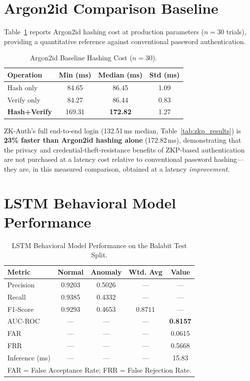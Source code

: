 \documentclass[12pt,a4paper,oneside]{report}
\begin{document}
\section{Argon2id Comparison Baseline}

Table~\ref{tab:argon_baseline} reports Argon2id hashing cost at
production parameters ($n=30$ trials), providing a quantitative
reference against conventional password authentication.

\begin{table}[htbp]
\renewcommand{\arraystretch}{1.25}
\caption{Argon2id Baseline Hashing Cost ($n=30$).}
\label{tab:argon_baseline}
\centering
\begin{tabular}{lccc}
\toprule
\textbf{Operation} & \textbf{Min (ms)} & \textbf{Median (ms)} & \textbf{Std (ms)} \\
\midrule
Hash only    & 84.65  & 86.45  & 1.09 \\
Verify only  & 84.27  & 86.44  & 0.83 \\
\textbf{Hash+Verify} & 169.31 & \textbf{172.82} & 1.27 \\
\bottomrule
\end{tabular}
\end{table}

ZK-Auth's full end-to-end login (132.51\,ms median, Table~\ref{tab:zkp_results})
is \textbf{23\% faster than Argon2id hashing alone} (172.82\,ms),
demonstrating that the privacy and credential-theft-resistance benefits of
ZKP-based authentication are not purchased at a latency cost relative to
conventional password hashing---they are, in this measured comparison,
obtained at a latency \textit{improvement}.

\section{LSTM Behavioral Model Performance}

\begin{table}[htbp]
\renewcommand{\arraystretch}{1.25}
\caption{LSTM Behavioral Model Performance on the Balabit Test Split.}
\label{tab:lstm_results}
\centering
\begin{tabular}{lcccc}
\toprule
\textbf{Metric} & \textbf{Normal} & \textbf{Anomaly} & \textbf{Wtd. Avg} & \textbf{Value} \\
\midrule
Precision      & 0.9203 & 0.5026 & ---    & --- \\
Recall         & 0.9385 & 0.4332 & ---    & --- \\
F1-Score       & 0.9293 & 0.4653 & 0.8711 & --- \\
AUC-ROC        & ---    & ---    & ---    & \textbf{0.8157} \\
FAR            & ---    & ---    & ---    & 0.0615 \\
FRR            & ---    & ---    & ---    & 0.5668 \\
Inference (ms) & ---    & ---    & ---    & 15.83 \\
\bottomrule
\multicolumn{5}{l}{\footnotesize FAR = False Acceptance Rate; FRR = False Rejection Rate.}
\end{tabular}
\end{table}
\end{document}
